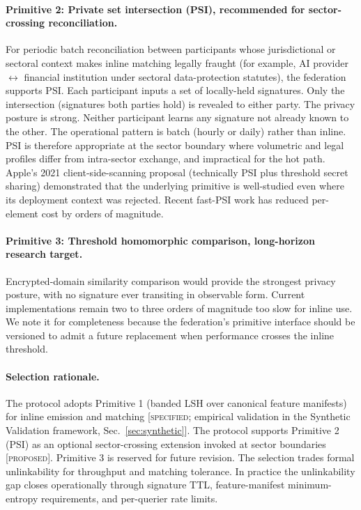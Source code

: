 \documentclass[11pt]{article}
\begin{document}
\paragraph{Primitive 2: Private set intersection (PSI), recommended for sector-crossing reconciliation.}
For periodic batch reconciliation between participants whose jurisdictional or sectoral context makes inline matching legally fraught (for example, AI provider $\leftrightarrow$ financial institution under sectoral data-protection statutes), the federation supports PSI. Each participant inputs a set of locally-held signatures. Only the intersection (signatures both parties hold) is revealed to either party. The privacy posture is strong. Neither participant learns any signature not already known to the other. The operational pattern is batch (hourly or daily) rather than inline. PSI is therefore appropriate at the sector boundary where volumetric and legal profiles differ from intra-sector exchange, and impractical for the hot path. Apple's 2021 client-side-scanning proposal (technically PSI plus threshold secret sharing) demonstrated that the underlying primitive is well-studied even where its deployment context was rejected. Recent fast-PSI work has reduced per-element cost by orders of magnitude.

\paragraph{Primitive 3: Threshold homomorphic comparison, long-horizon research target.}
Encrypted-domain similarity comparison would provide the strongest privacy posture, with no signature ever transiting in observable form. Current implementations remain two to three orders of magnitude too slow for inline use. We note it for completeness because the federation's primitive interface should be versioned to admit a future replacement when performance crosses the inline threshold.

\paragraph{Selection rationale.}
The protocol adopts Primitive 1 (banded LSH over canonical feature manifests) for inline emission and matching [\textsc{specified}; empirical validation in the Synthetic Validation framework, Sec.~\ref{sec:synthetic}]. The protocol supports Primitive 2 (PSI) as an optional sector-crossing extension invoked at sector boundaries [\textsc{proposed}]. Primitive 3 is reserved for future revision. The selection trades formal unlinkability for throughput and matching tolerance. In practice the unlinkability gap closes operationally through signature TTL, feature-manifest minimum-entropy requirements, and per-querier rate limits.
\end{document}
